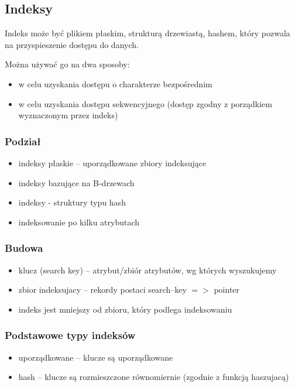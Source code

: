 \documentclass[12pt]{article}
\begin{document}
\subsection{Indeksy}
Indeks może być plikiem płaskim, strukturą drzewiastą, hashem, który pozwala na
przyspieszenie dostępu do danych.

Można używać go na dwa sposoby:
\begin{itemize}
\item w celu uzyskania dostępu o charakterze bezpośrednim
\item w celu uzyskania dostępu sekwencyjnego (dostęp zgodny z porządkiem wyznaczonym przez indeks)
\end{itemize}

\subsubsection{Podział}
\begin{itemize}
\item indeksy płaskie -- uporządkowane zbiory indeksujące
\item indeksy bazujące na B-drzewach
\item indeksy - struktury typu hash
\item indeksowanie po kilku atrybutach
\end{itemize}

\subsubsection{Budowa}
\begin{itemize}
\item klucz (search key) -- atrybut/zbiór atrybutów, wg których wyszukujemy
\item zbior indeksujacy -- rekordy postaci search--key $=>$ pointer
\item indeks jest mniejszy od zbioru, który podlega indeksowaniu
\end{itemize}

\subsubsection{Podstawowe typy indeksów}
\begin{itemize}
\item uporządkowane -- klucze są uporządkowane
\item hash -- klucze są rozmieszczone równomiernie (zgodnie z funkcją haszujacą)
\end{itemize}
\end{document}
